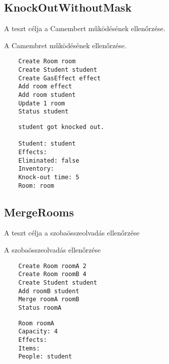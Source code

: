 \subsection{KnockOutWithoutMask}
\begin{test-case-description}
    A teszt célja a Camembert működésének ellenőrzése.
\end{test-case-description}
\begin{test-case-function}
    A Camembret működésének ellenőrzése.
\end{test-case-function}
\begin{test-case-input}
    \begin{verbatim}
    Create Room room
    Create Student student
    Create GasEffect effect
    Add room effect
    Add room student
    Update 1 room
    Status student
    \end{verbatim}
\end{test-case-input}
\begin{test-case-output}
    \begin{verbatim}
    student got knocked out.
    
    Student: student
    Effects: 
    Eliminated: false
    Inventory: 
    Knock-out time: 5
    Room: room
    \end{verbatim}
\end{test-case-output}

\subsection{MergeRooms}
\begin{test-case-description}
    A teszt célja a szobaösszeolvadás ellenőrzése
\end{test-case-description}
\begin{test-case-function}
    A szobaösszeolvadás ellenőrzése
\end{test-case-function}
\begin{test-case-input}
    \begin{verbatim}
    Create Room roomA 2
    Create Room roomB 4
    Create Student student
    Add roomB student
    Merge roomA roomB
    Status roomA
    \end{verbatim}
\end{test-case-input}
\begin{test-case-output}
    \begin{verbatim}
    Room roomA
    Capacity: 4
    Effects:
    Items: 
    People: student
    \end{verbatim}
\end{test-case-output}

